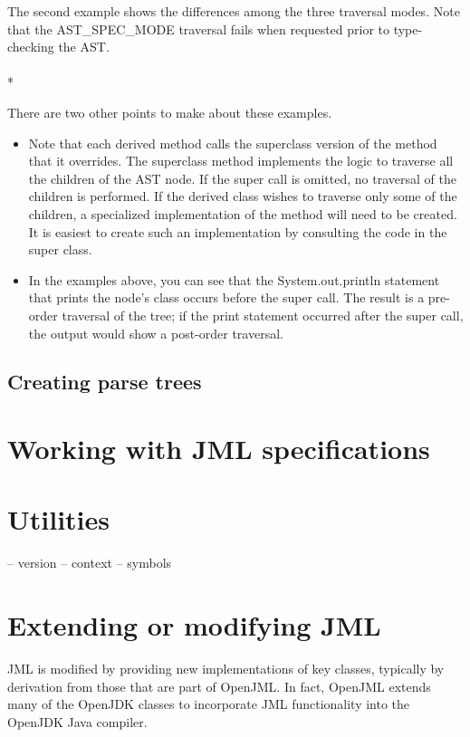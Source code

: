 \documentclass{report}%
\newcommand{\boxspace}{\vspace*{6pt}}
\newcommand{\boxedinputc}[2]{\boxspace \\ \fbox{\parbox{6.00in}{\tt }} \fcolorbox{black}{gray}{\parbox{6.00in}{\tt }} \boxspace\\*}
\newcommand{\source}{../demos}
\newcommand{\demo}[1]{\boxedinputc{\source/#1.java}{\source/#1.txt}}
\begin{document}
The second example shows the differences among the three traversal modes. Note that the AST\_SPEC\_MODE traversal fails when requested prior to type-checking the AST.
\demo{DemoWalkTree2}

There are two other points to make about these examples.
\begin{itemize}
\item Note that each derived method calls the superclass version of the method that it overrides. The superclass method implements the logic to traverse all the children of the AST node. If the super call is omitted, no traversal of the children is performed. If the derived class wishes to traverse only some of the children, a specialized implementation of the method will need to be created.
It is easiest to create such an implementation by consulting the code in the super class.
\item In the examples above, you can see that the System.out.println statement that prints the node's class occurs before the super call. The result is a pre-order traversal of the tree; if the print statement occurred after the super call, the output would show a post-order traversal.
\end{itemize}


\subsection{Creating parse trees}

\section{Working with JML specifications}

\section{Utilities}

-- version
-- context
-- symbols

\section{Extending or modifying JML}
JML is modified by providing new implementations of key classes, typically by derivation from those that are part of OpenJML.
In fact, OpenJML extends many of the OpenJDK classes to incorporate JML functionality into the OpenJDK Java compiler.
\end{document}
